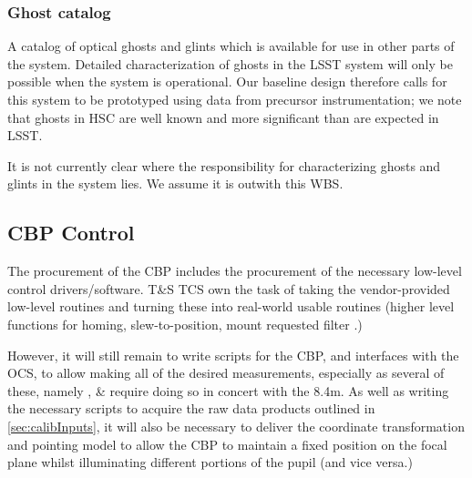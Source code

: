 \subsubsection{Ghost catalog}\label{calibProducts:GhostCatalog}
A catalog of optical ghosts and glints which is available for use in other parts of the system. Detailed characterization of ghosts in the LSST system will only be possible when the system is operational. Our baseline design therefore calls for this system to be prototyped using data from precursor instrumentation; we note that ghosts in \eg HSC are well known and more significant than are expected in LSST.
\begin{note}
It is not currently clear where the responsibility for characterizing ghosts and glints in the system lies. We assume it is outwith this WBS.
\end{note}





\subsection{CBP Control}\label{CBP_control}
The procurement of the CBP includes the procurement of the necessary low-level control drivers/software. T\&S TCS own the task of taking the vendor-provided low-level routines and turning these into real-world usable routines (higher level functions for \eg homing, slew-to-position, mount requested filter \etc.)

However, it will still remain to write scripts for the CBP, and interfaces with the OCS, to allow making all of the desired measurements, especially as several of these, namely \xxx, \xxx \& \xxx require doing so in concert with the 8.4m.
\alg As well as writing the necessary scripts to acquire the raw data products outlined in \secsymbol\ref{sec:calibInputs}, it will also be necessary to deliver the coordinate transformation and pointing model to allow the CBP to maintain a fixed position on the focal plane whilst illuminating different portions of the pupil (and vice versa.)


















